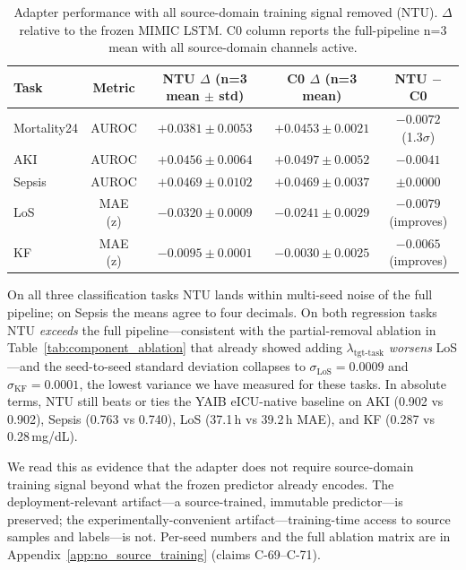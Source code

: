 \begin{table}[t]
\centering\small
\caption{Adapter performance with all source-domain training signal removed (NTU). $\Delta$ relative to the frozen MIMIC LSTM. C0 column reports the full-pipeline n=3 mean with all source-domain channels active.}
\label{tab:no_source_training}
\begin{tabular}{l c c c c}
\toprule
Task & Metric & NTU $\Delta$ (n=3 mean $\pm$ std) & C0 $\Delta$ (n=3 mean) & NTU $-$ C0 \\
\midrule
Mortality24 & AUROC & $+0.0381 \pm 0.0053$ & $+0.0453 \pm 0.0021$ & $-0.0072$ (1.3$\sigma$) \\
AKI         & AUROC & $+0.0456 \pm 0.0064$\footnotemark[1] & $+0.0497 \pm 0.0052$ & $-0.0041$ \\
Sepsis      & AUROC & $+0.0469 \pm 0.0102$ & $+0.0469 \pm 0.0037$ & $\pm0.0000$ \\
LoS         & MAE (z) & $\mathbf{-0.0320 \pm 0.0009}$ & $-0.0241 \pm 0.0029$ & $\mathbf{-0.0079}$ (improves) \\
KF          & MAE (z) & $\mathbf{-0.0095 \pm 0.0001}$ & $-0.0030 \pm 0.0025$ & $\mathbf{-0.0065}$ (improves) \\
\bottomrule
\end{tabular}
\end{table}

On all three classification tasks NTU lands within multi-seed noise of the full pipeline; on Sepsis the means agree to four decimals. On both regression tasks NTU \emph{exceeds} the full pipeline---consistent with the partial-removal ablation in Table~\ref{tab:component_ablation} that already showed adding $\lambda_{\text{tgt-task}}$ \emph{worsens} LoS---and the seed-to-seed standard deviation collapses to $\sigma_{\text{LoS}}=0.0009$ and $\sigma_{\text{KF}}=0.0001$, the lowest variance we have measured for these tasks. In absolute terms, NTU still beats or ties the YAIB eICU-native baseline on AKI (0.902 vs 0.902), Sepsis (0.763 vs 0.740), LoS (37.1\,h vs 39.2\,h MAE), and KF (0.287 vs 0.28\,mg/dL).

We read this as evidence that the adapter does not require source-domain training signal beyond what the frozen predictor already encodes. The deployment-relevant artifact---a source-trained, immutable predictor---is preserved; the experimentally-convenient artifact---training-time access to source samples and labels---is not. Per-seed numbers and the full ablation matrix are in Appendix~\ref{app:no_source_training} (claims C-69--C-71).


